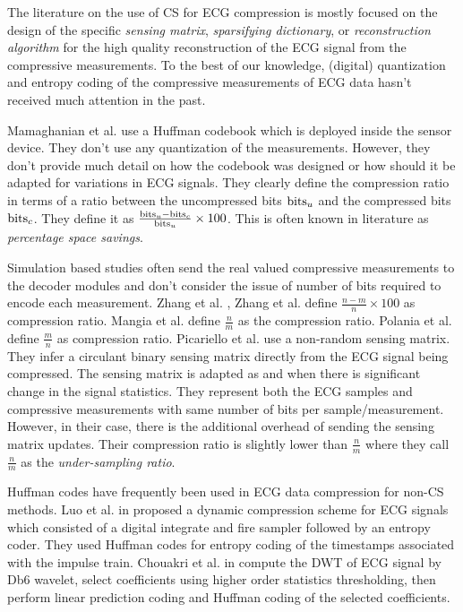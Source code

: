 The literature on the use of CS for ECG compression is mostly
focused on the design of the specific \emph{sensing matrix},
\emph{sparsifying dictionary}, or \emph{reconstruction algorithm}
for the high quality reconstruction of the ECG signal from the
compressive measurements.
To the best of our knowledge, (digital) quantization and entropy coding of
the compressive measurements of ECG data hasn't received
much attention in the past.

Mamaghanian et al.\cite{mamaghanian2011compressed} use a Huffman codebook
which is deployed inside the sensor device. They don't
use any quantization of the measurements.
However, they don't
provide much detail on how the codebook was designed or how should
it be adapted for variations in ECG signals.
They clearly define the compression ratio in terms
of a ratio between the uncompressed bits $\mathrm{bits}_u$
and the compressed bits $\mathrm{bits}_c$. They define it
as $\frac{\mathrm{bits}_u - \mathrm{bits}_c}{\mathrm{bits}_u} \times 100$.
This is often known in literature as
\emph{percentage space savings}.

Simulation based studies often send the real valued compressive
measurements to the decoder modules and don't consider the issue
of number of bits required to encode each measurement.
Zhang et al. \cite{zhang2012compressed},
Zhang et al. \cite{zhang2021csnet} define
$\frac{n - m}{n} \times 100$ as compression ratio. 
Mangia et al. \cite{mangia2020deep} define $\frac{n}{m}$
as the compression ratio.
Polania et al. \cite{polania2018compressed} define
$\frac{m}{n}$ as compression ratio.
Picariello et al. \cite{picariello2021novel} use
a non-random sensing matrix.
They infer a circulant binary sensing matrix
directly from the ECG signal being compressed.
The sensing matrix is adapted as and when
there is significant change in the signal
statistics.
They represent both the ECG samples and
compressive measurements with same number of
bits per sample/measurement. However,
in their case, there is the additional
overhead of sending the sensing matrix updates.
Their compression ratio is slightly lower than
$\frac{n}{m}$ where they call $\frac{n}{m}$ as
the \emph{under-sampling ratio}.


Huffman codes have frequently been used in ECG data
compression for non-CS methods.
Luo et al. in \cite{luo2014dynamic} proposed a dynamic
compression scheme for ECG signals which consisted
of a digital integrate and fire sampler followed
by an entropy coder. They used Huffman codes for
entropy coding of the timestamps associated with
the impulse train.
Chouakri et al. in \cite{chouakri2013wavelet} compute
the DWT of ECG signal by Db6 wavelet, select coefficients
using higher order statistics thresholding, then perform
linear prediction coding and Huffman coding of the selected
coefficients.  

